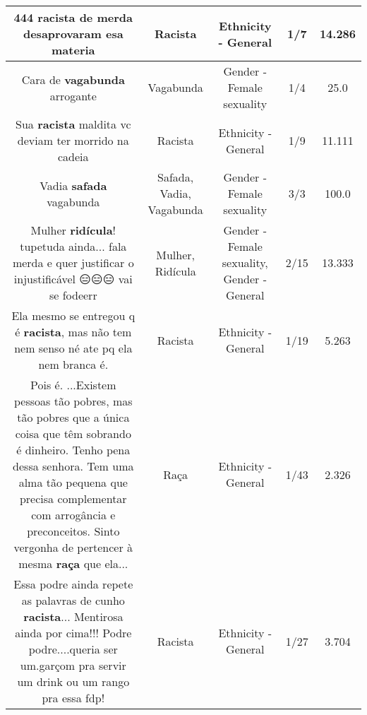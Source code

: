 \documentclass[11pt]{article}
\newlength\mylength
\begin{document}
\begin{center}
\begin{longtable}{|C{.65\mylength}|C{.30\mylength}|C{.12\mylength}|C{.12\mylength}|C{.12\mylength}|}
  \small 444 \textbf{racista} de merda desaprovaram esa materia\normalsize   & Racista & Ethnicity - General & 1/7 & 14.286 \\  \hline
  \small Cara de \textbf{vagabunda} arrogante\normalsize   & Vagabunda & Gender - Female sexuality & 1/4 & 25.0 \\  \hline
  \small Sua \textbf{racista} maldita vc deviam ter morrido na cadeia\normalsize   & Racista & Ethnicity - General & 1/9 & 11.111 \\  \hline
  \small Vadia \textbf{safada} vagabunda\normalsize   & Safada, Vadia, Vagabunda & Gender - Female sexuality & 3/3 & 100.0 \\  \hline
  \small Mulher \textbf{ridícula}! tupetuda ainda... fala merda e quer justificar o injustificável  😑😑😑 vai se fodeerr\normalsize   & Mulher, Ridícula & Gender - Female sexuality, Gender - General & 2/15 & 13.333 \\  \hline
  \small Ela mesmo se entregou q é \textbf{racista}, mas não tem nem senso né ate pq ela nem branca é.\normalsize   & Racista & Ethnicity - General & 1/19 & 5.263 \\  \hline
  \small Pois é. ...Existem pessoas tão pobres, mas tão pobres que a única coisa que têm sobrando é dinheiro.  Tenho pena dessa senhora. Tem uma alma tão pequena que precisa complementar com arrogância e preconceitos. Sinto vergonha de pertencer à mesma \textbf{raça} que ela...\normalsize   & Raça & Ethnicity - General & 1/43 & 2.326 \\  \hline
  \small Essa podre ainda repete as palavras de cunho \textbf{racista}... Mentirosa ainda por cima!!! Podre podre....queria ser um.garçom pra servir um drink ou um rango pra essa fdp!\normalsize   & Racista & Ethnicity - General & 1/27 & 3.704 \\  \hline

\end{longtable}
\end{center}
\end{document}
